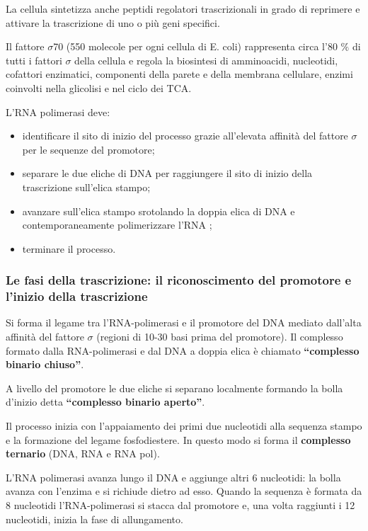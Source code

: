 \documentclass[11pt]{book}
\begin{document}
La cellula sintetizza anche peptidi regolatori trascrizionali in grado di reprimere e attivare la trascrizione di uno o più geni specifici.

Il fattore $\sigma$70 (550 molecole per ogni cellula di E. coli) rappresenta circa l’80 $\%$ di tutti i fattori $\sigma$ della cellula e regola la biosintesi di amminoacidi, nucleotidi, cofattori enzimatici, componenti della parete e della membrana cellulare, enzimi coinvolti nella glicolisi e nel ciclo dei TCA.

L’RNA polimerasi deve: 
\begin{itemize}
\item identificare il sito di inizio del processo grazie all’elevata affinità del fattore $\sigma$ per le sequenze del promotore;
\item separare le due eliche di DNA per raggiungere il sito di inizio della trascrizione sull’elica stampo;
\item avanzare sull’elica stampo srotolando la doppia elica di DNA e contemporaneamente polimerizzare l'RNA ;
\item terminare il processo.
\end{itemize}

\subsubsection{Le fasi della trascrizione: il riconoscimento del 
promotore e l'inizio della trascrizione}

Si forma il legame tra l'RNA-polimerasi e il promotore del DNA mediato dall’alta affinità del fattore $\sigma$ (regioni di 10-30 basi prima del promotore). Il complesso formato dalla RNA-polimerasi e dal DNA a doppia elica è chiamato \textbf{``complesso binario chiuso''}.

A livello del promotore le due eliche si separano localmente formando la bolla d’inizio detta \textbf{``complesso binario aperto''}.

Il processo inizia con l’appaiamento dei primi due nucleotidi alla sequenza stampo e la formazione del legame fosfodiestere. In questo modo si forma il \textbf{complesso ternario} (DNA, RNA e RNA pol).

L'RNA polimerasi avanza lungo il DNA e aggiunge altri 6 nucleotidi: la bolla avanza con l’enzima e si richiude dietro ad esso.
Quando la sequenza è formata da 8 nucleotidi l’RNA-polimerasi si stacca dal promotore e, una volta raggiunti i 12 nucleotidi, inizia la fase di allungamento.
\end{document}
